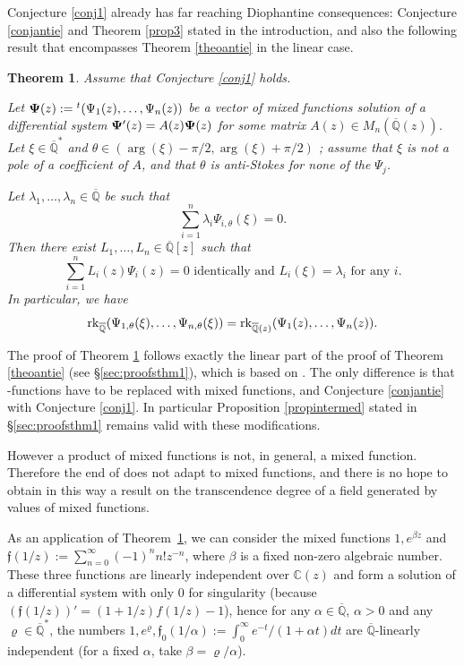 \documentclass[reqno,12pt]{article}
\numberwithin{equation}{section}
\newtheorem{theo}{Theorem}
\theoremstyle{remark}
\newcommand{\Qbar}{\overline{\mathbb Q}}
\newcommand{\etoile}{^*}
\newcommand{\rk}{{\rm rk}}
\newcommand{\tantie}{\foreignlanguage{russian}{\CYREREV}}
\newcommand{\antie}{\text{\tantie}}
\newcommand{\fgo}{\mathfrak{f}}
\begin{document}
Conjecture \ref{conj1} already has far reaching Diophantine consequences: Conjecture \ref{conjantie} and Theorem \ref{prop3} stated in the introduction, and also the following   result that encompasses Theorem \ref{theoantie} in the linear case. 




\begin{theo}\label{theomixte} 
Assume that Conjecture \ref{conj1}  holds.

Let ${\bf \Psi}(z):={}^t(\Psi_1(z), \ldots, \Psi_n(z))$ be a vector of mixed functions  solution of a differential system ${\bf \Psi}'(z)=A(z){\bf \Psi}(z)$ for some matrix $A(z)\in M_n(\Qbar(z))$.  Let $\xi\in\Qbar\etoile$ and $\theta\in (\arg(\xi)-\pi/2,\arg(\xi)+\pi/2)$ ; assume that $\xi$ is not a pole of a coefficient of $A$, and that $\theta$ is anti-Stokes for none of the $\Psi_j$. 

Let $\lambda_1,\ldots, \lambda_n  \in\Qbar $ be  such that 
$$\sum_{i=1}^n \lambda_i 
 \Psi_{i,\theta}(\xi) =0.$$
Then there exist $L_1,\ldots, L_n \in \Qbar[z]$  such that 
$$\sum_{i=1}^n L_i(z) \Psi_i(z) = 0 \mbox{ identically  and } L_i(\xi) = \lambda_i  \mbox{ for any } i.$$
In particular, we have
$$\rk_{\Qbar}( \Psi_{1,\theta}(\xi), \ldots, \Psi_{n,\theta}(\xi)) = 
\rk_{\Qbar(z)}( \Psi_{1 }(z), \ldots, \Psi_{n}(z)). $$
\end{theo}

The proof of Theorem \ref{theomixte} follows exactly the linear part of the proof of Theorem \ref{theoantie} (see \S \ref{sec:proofsthm1}), which is based on \cite[\S 3]{beukers}. The only difference is that \antie-functions have to be replaced with mixed functions, and Conjecture \ref{conjantie} with Conjecture \ref{conj1}. In particular Proposition  \ref{propintermed} stated in \S \ref{sec:proofsthm1} remains valid with these modifications. 

However a product of mixed functions is not, in general, a mixed function. Therefore the end of  \cite[\S 3]{beukers} does not adapt to mixed functions, and there is no hope to obtain in this way a result on the transcendence degree of a field generated by values of mixed functions.



 As an application of Theorem~\ref{theomixte}, we can consider the mixed functions $1, e^{\beta z}$ and $\fgo(1/z):=\sum_{n=0}^\infty (-1)^n n! z^{-n}$, where $\beta$ is a fixed non-zero algebraic number. These three functions are linearly independent over $\mathbb C(z)$ and form a solution of a differential system with only 0 for singularity (because $(\fgo(1/z))'=(1+1/z)f(1/z)-1$), hence for any $\alpha\in \Qbar$, $\alpha>0$ and any $\varrho \in \Qbar^*$, the numbers $1, e^{\varrho}, \fgo_0(1/\alpha):=\int_0^\infty e^{-t}/(1+\alpha t)dt$ are $\Qbar$-linearly independent (for a fixed $\alpha$, take $\beta=\varrho/\alpha$).
\end{document}
